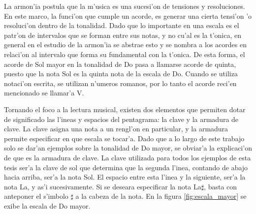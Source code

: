 La armon'ia postula que la m'usica es una sucesi'on de tensiones y resoluciones. En este marco, la funci'on que cumple un acorde, es generar una cierta
tensi'on 'o resoluci'on dentro de la tonalidad. Dado que lo importante en una escala es el patr'on de intervalos que se forman entre sus notas, y 
no cu'al es la t'onica, en general en el estudio de la armon'ia se abstrae esto y se nombra a los acordes en relaci'on al intervalo que forma su
fundamental con la t'onica. De esta forma, el acorde de Sol mayor en la tonalidad de Do pasa a llamarse acorde de quinta, puesto que la nota Sol
es la quinta nota de la escala de Do. Cuando se utiliza notaci'on escrita, se utilizan n'umeros romanos, por lo tanto el acorde reci'en mencionado
se llamar'a V. 



Tornando el foco a la lectura musical, existen dos elementos que permiten dotar de significado las l'ineas y espacios del pentagrama: la clave
y la armadura de clave. La clave asigna una nota a un rengl'on en particular, y la armadura permite especificar en que escala se tocar'a. 
Dado que a lo largo de este trabajo solo se dar'an ejemplos sobre la tonalidad de Do mayor, se obviar'a la explicaci'on de que es la armadura de clave. 
La clave utilizada para todos los ejemplos de esta tesis ser'a la clave de sol que determina que la segunda l'inea, contando de abajo hacia
arriba, ser'a la nota Sol. El espacio entre esta l'inea y la siguiente, ser'a la nota La, y as'i sucesivamente. Si se deseara especificar
la nota La$\sharp$, basta con anteponer el s'imbolo $\sharp$ a la cabeza de la nota. En la figura \ref{fig:escala_mayor} se exibe la escala de Do mayor.


\begin{imagen}
    \width{12cm}
\end{imagen}
